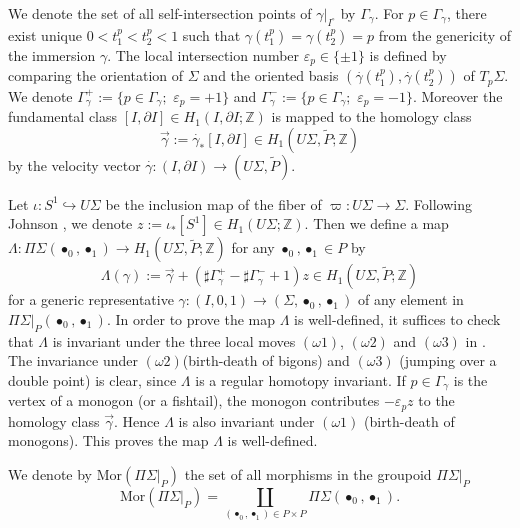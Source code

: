 \documentclass[a4paper,12pt, twoside]{amsart}
\theoremstyle{definition}
\theoremstyle{remark}
\numberwithin{equation}{section}
\newcommand\bZ{{\mathbb{Z}}}
\newcommand\La{\Lambda}
\newcommand\Mor{\mathrm{Mor}}
\newcommand\pa{\partial}
\begin{document}
We denote the set of all self-intersection points of $\gamma\vert_{I^\circ}$ by $\Gamma_\gamma$. For $p \in \Gamma_\gamma$, there exist unique $0 < t^p_1 < t^p_2 < 1$ such that $\gamma(t^p_1) = \gamma(t^p_2) = p$ from the genericity of the immersion $\gamma$. 
The local intersection number $\varepsilon_p \in \{\pm1\}$ is defined by comparing the orientation of $\Sigma$ and the oriented basis $(\overset\cdot\gamma(t^p_1),\overset\cdot\gamma(t^p_2))$ of $T_p\Sigma$. 
We denote $\Gamma^+_\gamma := \{p \in \Gamma_\gamma; \,\,\varepsilon_p = +1\}$ and $\Gamma^-_\gamma := \{p \in \Gamma_\gamma; \,\,\varepsilon_p = -1\}$. 
Moreover the fundamental class $[I, \pa I] \in H_1(I, \pa I; \bZ)$ is mapped to the homology class  
$$
\overrightarrow{\gamma} := \overset\cdot\gamma_*[I, \pa I] \in H_1(U\Sigma, \tilde P; \bZ)
$$
by the velocity vector $\overset\cdot\gamma: (I, \pa I) \to (U\Sigma, \tilde P)$.
\par
Let $\iota: S^1 \hookrightarrow U\Sigma$ be the inclusion map of the fiber of $\varpi: U\Sigma \to \Sigma$. Following Johnson \cite{J80a}, we denote $z := \iota_*[S^1] \in H_1(U\Sigma; \bZ)$. 
Then we define a map 
$\La: \Pi\Sigma(\bullet_0, \bullet_1) \to H_1(U\Sigma, \tilde P; \bZ)$
for any $\bullet_0, \bullet_1\in P$ 
by 
\begin{equation}\label{eq:tildeL}
\La(\gamma) := \overrightarrow{\gamma} + \left(\sharp\Gamma^+_{\gamma} - 
\sharp\Gamma^-_{\gamma} + 1\right)z \in H_1(U\Sigma, \tilde P; \bZ)
\end{equation}
for a generic representative $\gamma: (I, 0, 1) \to (\Sigma, \bullet_0, \bullet_1)$ of any element in $\Pi\Sigma\vert_P(\bullet_0, \bullet_1)$. In order to prove the map $\La$ is well-defined, it suffices to check that $\La$ is invariant under the three local moves $(\omega1)$, $(\omega2)$ and $(\omega3)$ in \cite[5.6 Lemma]{G2}. 
The invariance under $(\omega2)$(birth-death of bigons) and $(\omega3)$ (jumping over a double point) is clear, since $\La$ is a regular homotopy invariant. If $p \in \Gamma_\gamma$ is the vertex of a monogon (or a fishtail), the monogon contributes $-\varepsilon_pz$ to the homology class $\overrightarrow{\gamma}$. Hence $\La$ is also invariant under $(\omega1)$ (birth-death of monogons). 
This proves the map $\La$ is well-defined.\par
We denote by $\Mor(\Pi\Sigma\vert_P)$ the set of all morphisms in the groupoid $\Pi\Sigma\vert_P$
$$
\Mor(\Pi\Sigma\vert_P) = {\coprod}_{(\bullet_0, \bullet_1) \in P\times P}\Pi\Sigma(\bullet_0, \bullet_1).
$$
\end{document}

